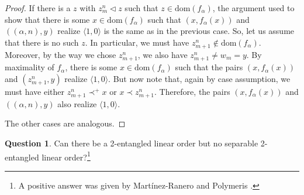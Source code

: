 \documentclass[12pt]{amsart}
\theoremstyle{definition}
\newtheorem{question}[theorem]{Question}
\theoremstyle{remark}
\begin{document}
\begin{proof}
If there is a $z$ with $z_m^n \lhd z$ such that $z \in \mathrm{dom}(f_\alpha)$, the argument used to show that there is some $x \in \mathrm{dom}(f_\alpha)$ such that  $(x, f_\alpha(x))$ and $((\alpha, n), y)$ realize $\langle 1,0\rangle$ is the same as in the previous case. So, let us assume that there is no such $z$. In particular, we must have $z_{m+1}^n \not\in \mathrm{dom}(f_\alpha)$. Moreover, by the way we chose $z_{m+1}^n$, we also have $z_{m+1}^n \neq w_m = y$. By maximality of $f_\alpha$, there is some $x \in \mathrm{dom}(f_\alpha)$ such that the pairs $(x, f_\alpha(x))$ and $(z_{m+1}^n, y)$ realize $\langle 1,0\rangle$. But now note that, again by case assumption, we must have either $z_{m+1}^n \prec^+ x$ or $x \prec z_{m+1}^n$. Therefore, the pairs $(x, f_\alpha(x))$ and $((\alpha, n), y)$ also realize $\langle 1,0\rangle$.

The other cases are analogous.
\end{proof}

\begin{question}
Can there be a 2-entangled linear order but no separable 2-entangled linear order?\footnote{A positive answer was given by Mart\'{i}nez-Ranero and Polymeris \cite{martinezranero2025entangledsuslinlinesoga}.}
\end{question}


\printbibliography
\end{document}
